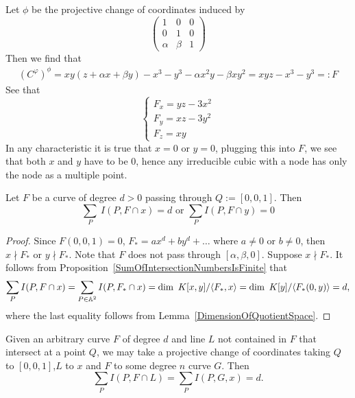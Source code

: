 \begin{example}
\begin{enumerate}
            Let $\phi$ be the projective change of coordinates induced by 
            $$
                \begin{pmatrix}
                    1 & 0 & 0\\
                    0 & 1 & 0\\
                    \alpha & \beta & 1
                \end{pmatrix}
            $$
            Then we find that 
            \begin{align*}
                (C^\varphi)^\phi= xy(z+\alpha x+\beta y)-x^3-y^3-\alpha  x^2y-\beta xy^2=  xyz-x^3-y^3=: F
            \end{align*}
            See that 
            $$
                \begin{cases}
                    F_x = yz-3x^2\\
                    F_y = xz -3y^2\\
                    F_z = xy
                \end{cases}
            $$
            In any characteristic it is true that $x=0$ or $y = 0$, plugging this into $F$, we see that both $x$ and $y$ have to be $0$, hence any irreducible cubic with a node has only the node as a multiple point. 
        \end{enumerate}
    \end{example}
    \begin{lemma}
        Let $F$ be a curve of degree $d>0$ passing through $Q:=[0,0,1]$. Then 
        $$\sum_P \ I(P,F\cap x)=d \text{ or } \sum_P I(P,F\cap y) = 0$$ 
    \end{lemma}
    \begin{proof}
        Since $F(0,0,1)=0$, $F_\ast=ax^d+by^d+\dots$ where $a\neq 0$ or $b\neq 0$, then $x \nmid F_\ast$ or $y\nmid F_\ast$. Note that $F$ does not pass through $[\alpha,\beta,0]$. Suppose $x\nmid F_\ast$. It follows from Proposition~\ref{SumOfIntersectionNumbersIsFinite} that 
        \begin{align*}
            \sum_P I(P,F\cap x)=\sum_{P\in \mathbb{A}^2} I(P,F_\ast\cap x) = \dim\ K[x,y]/\langle F_\ast,x\rangle = \dim\ K[y]/\langle F_\ast(0,y)\rangle= d,
        \end{align*}
        where the last equality follows from Lemma~\ref{DimensionOfQuotientSpace}.
    \end{proof}
    \begin{remark}
        Given an arbitrary curve $F$ of degree $d$ and line $L$ not contained in $F$ that intersect at a point $Q$, we may take a projective change of coordinates taking $Q$ to $[0,0,1]$,$L$ to $x$ and $F$ to some degree $n$ curve $G$. Then 
        $$\sum_P I(P,F\cap L)=\sum_P I(P,G,x)= d.$$
    \end{remark}
